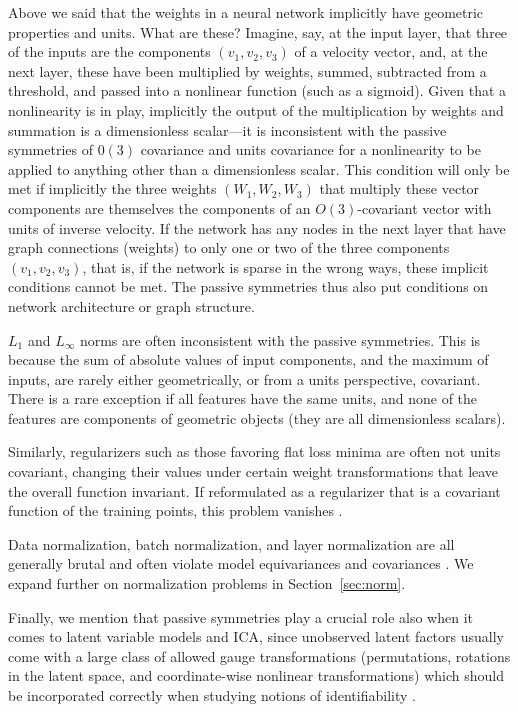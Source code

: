 \documentclass{article} %
\newcommand{\sectionname}{Section}
\newcommand{\secref}[1]{\sectionname~\ref{#1}}
\begin{document}
Above we said that the weights in a neural network implicitly have geometric properties and units.
What are these?
Imagine, say, at the input layer, that three of the inputs are the components $(v_1, v_2, v_3)$ of a velocity vector, and, at the next layer, these have been multiplied by weights, summed, subtracted from a threshold, and passed into a nonlinear function (such as a sigmoid).
Given that a nonlinearity is in play, implicitly the output of the multiplication by weights and summation is a dimensionless scalar---it is inconsistent with the passive symmetries of $0(3)$ covariance and units covariance for a nonlinearity to be applied to anything other than a dimensionless scalar.
This condition will only be met if implicitly the three weights $(W_1, W_2, W_3)$ that multiply these vector components are themselves the components of an $O(3)$-covariant vector with units of inverse velocity.
If the network has any nodes in the next layer that have graph connections (weights) to only one or two of the three components $(v_1, v_2, v_3)$, that is, if the network is sparse in the wrong ways, these implicit conditions cannot be met.
The passive symmetries thus also put conditions on network architecture or graph structure.

$L_1$ and $L_\infty$ norms are often inconsistent with the passive symmetries.
This is because the sum of absolute values of input components, and the maximum of inputs, are rarely either geometrically, or from a units perspective, covariant.
There is a rare exception if all features have the same units, and none of the features are components of geometric objects (they are all dimensionless scalars).

Similarly, regularizers such as those favoring flat loss minima \citep{flatminima,sharpminima,petzka2021relative} are often not units covariant, changing their values under certain weight transformations that leave the overall function invariant. 
If reformulated as a regularizer that is a covariant function of the training points, this problem vanishes \citep{LuxburgBS04}.

Data normalization, batch normalization, and layer normalization are all generally brutal and often violate model equivariances and covariances \citep{aalto2022geometric}.
We expand further on normalization problems in \secref{sec:norm}.

Finally, we mention that passive symmetries play a crucial role also when it comes to latent variable models and ICA, since unobserved latent factors usually come with a large class of allowed gauge transformations (permutations, rotations in the latent space, and coordinate-wise nonlinear transformations) which should be incorporated correctly when studying notions of identifiability \citep{khemakhem2020ice, BucBesSch22}.
\end{document}
